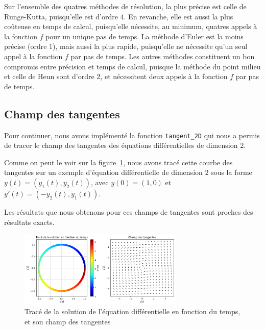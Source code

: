 Sur l'ensemble des quatres méthodes de résolution, la plus précise est celle de Runge-Kutta, puisqu'elle est d'ordre $4$.
En revanche, elle est aussi la plus coûteuse en temps de calcul, puisqu'elle nécessite, au minimum, quatres appels à la fonction $f$ pour un unique pas de temps.
La méthode d'Euler est la moins précise (ordre $1$), mais aussi la plus rapide, puisqu'elle ne nécessite qu'un seul appel à la fonction $f$ par pas de temps.
Les autres méthodes constituent un bon compromis entre précision et temps de calcul, puisque la méthode du point milieu et celle de Heun sont d'ordre $2$, et nécessitent deux appels à la fonction $f$ par pas de temps.

\subsection{Champ des tangentes}
Pour continuer, nous avons implémenté la fonction \texttt{tangent\_2D} qui nous a permis de tracer le champ des tangentes
des équations différentielles de dimension $2$.

Comme on peut le voir sur la figure~\ref{fig:tangente}, nous avons tracé cette courbe des tangentes sur un exemple d'équation différentielle
de dimension $2$ sous la forme $y(t)=(y_1(t),y_2(t))$, avec $y(0)=(1,0)$ et $y'(t)=(-y_2(t),y_1(t))$.

Les résultats que nous obtenons pour ces champs de tangentes sont proches des résultats exacts.

\begin{figure}[htbp!]
	\centering
	\includegraphics[width=0.7\textwidth]{res/tangente}
	\caption{Tracé de la solution de l'équation différentielle en fonction du temps, et son champ des tangentes}
	\label{fig:tangente}
\end{figure}
